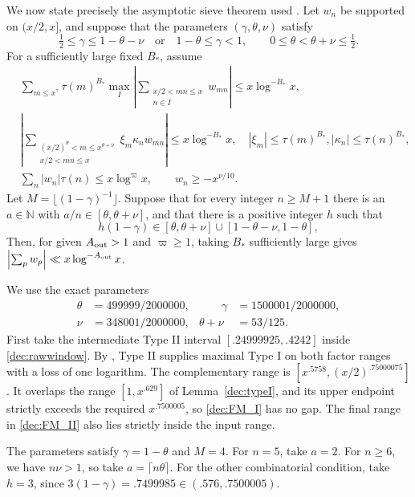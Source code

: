 \documentclass[11pt,a4paper]{article}
\theoremstyle{paperplain}
\numberwithin{equation}{section}
\begin{document}
We now state precisely the asymptotic sieve theorem used
\cite[Theorem 2.2(a)]{FordMaynard2024}.
Let $w_n$ be supported on $(x/2,x]$, and suppose that the parameters
$(\gamma,\theta,\nu)$ satisfy
\[
 \tfrac12\le\gamma\le1-\theta-\nu\quad\text{or}\quad
 1-\theta\le\gamma<1,\qquad
 0\le\theta<\theta+\nu\le\tfrac12.
\]
For a sufficiently large fixed $B_*$, assume
\begin{align}
 &\sum_{m\le x^\gamma}\tau(m)^{B_*}\max_I
 \left|\sum_{\substack{x/2<mn\le x\\n\in I}}w_{mn}\right|
 \le x\log^{-B_*}x,\label{dec:FM_I}\\
 &\left|\sum_{\substack{(x/2)^\theta<m\le x^{\theta+\nu}\\x/2<mn\le x}}
 \xi_m\kappa_nw_{mn}\right|\le x\log^{-B_*}x,\quad
 |\xi_m|\le\tau(m)^{B_*}, |\kappa_n|\le\tau(n)^{B_*},\label{dec:FM_II}\\
 &\sum_n|w_n|\tau(n)\le x\log^\varpi x,\qquad
 w_n\ge-x^{\nu/10}.\label{dec:FM_growth}
\end{align}
Let $M=\lfloor(1-\gamma)^{-1}\rfloor$.
Suppose that for every integer $n\ge M+1$ there is an
$a\in\mathbb N$ with $a/n\in[\theta,\theta+\nu]$, and that
there is a positive integer $h$ such that
\[
 h(1-\gamma)\in[\theta,\theta+\nu]\cup[1-\theta-\nu,1-\theta],
\]
Then, for given $A_{\rm out}>1$ and $\varpi\ge1$, taking $B_*$
sufficiently large gives $\left|\sum_pw_p\right|\ll x\log^{-A_{\rm out}}x$.

We use the exact parameters
\begin{equation}\label{dec:FMparameters}
 \begin{aligned}
 \theta&=499999/2000000,&\qquad \gamma&=1500001/2000000,\\
 \nu&=348001/2000000,& \theta+\nu&=53/125.
 \end{aligned}
\end{equation}
First take the intermediate Type II interval
$[.24999925,.4242]$ inside \eqref{dec:rawwindow}.
By \cite[Proposition~4.11]{FordMaynard2024}, Type II supplies
maximal Type I on both factor ranges with a loss of one logarithm. The complementary range is
$[x^{.5758},(x/2)^{.75000075}]$.
It overlaps the range $[1,x^{.629}]$ of Lemma~\ref{dec:typeI},
and its upper endpoint strictly exceeds the required
$x^{.7500005}$, so \eqref{dec:FM_I} has no gap.
The final range in \eqref{dec:FM_II} also lies strictly inside the
input range.

The parameters satisfy $\gamma=1-\theta$ and $M=4$.
For $n=5$, take $a=2$.
For $n\ge6$, we have $n\nu>1$, so take $a=\lceil n\theta\rceil$.
For the other combinatorial condition, take $h=3$, since
$3(1-\gamma)=.7499985\in(.576,.7500005)$.
\end{document}
